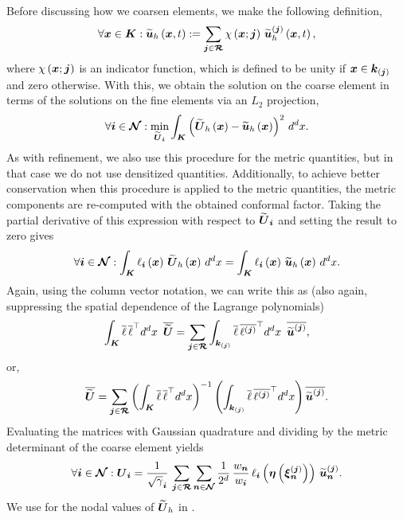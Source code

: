 Before discussing how we coarsen elements, we make the following definition,
\begin{equation}
  \forall\boldsymbol{x}\in\boldsymbol{K}:
  \widetilde{\boldsymbol{u}}_{h}\left(\boldsymbol{x},t\right)
  :=\sum\limits_{\boldsymbol{j}\in\boldsymbol{\mathcal{R}}}\chi\left(\boldsymbol{x};\boldsymbol{j}\right)\,
  \widetilde{\boldsymbol{u}}^{\left(\boldsymbol{j}\right)}_{h}\left(\boldsymbol{x},t\right),
\end{equation}
where $\chi\left(\boldsymbol{x};\boldsymbol{j}\right)$ is an indicator function, which is
defined to be unity if $\boldsymbol{x}\in\boldsymbol{k}_{\left(\boldsymbol{j}\right)}$ and zero
otherwise.
With this, we obtain the solution on the coarse
element in terms of the solutions
on the fine elements via an $L_{2}$ projection,
\begin{equation}
  \forall\boldsymbol{i}\in\boldsymbol{\mathcal{N}}:
  \min\limits_{\widetilde{\boldsymbol{U}}_{\boldsymbol{i}}}
  \int_{\boldsymbol{K}}
  \left(\widetilde{\boldsymbol{U}}_{h}\left(\boldsymbol{x}\right)
  -\widetilde{\boldsymbol{u}}_{h}\left(\boldsymbol{x}\right)\right)^{2}\,
  d^{d}x.
\end{equation}
As with refinement, we also use this procedure for the metric quantities,
but in that case we do not use densitized quantities.
Additionally, to achieve better conservation when this procedure is applied
to the metric quantities,
the metric components are re-computed with the obtained conformal factor.
Taking the partial derivative of this expression with respect to
$\widetilde{\boldsymbol{U}}_{\boldsymbol{i}}$ and setting the result to zero gives
\begin{equation}
  \forall\boldsymbol{i}\in\boldsymbol{\mathcal{N}}:
  \int_{\boldsymbol{K}}\ell_{\boldsymbol{i}}\left(\boldsymbol{x}\right)\,
  \widetilde{\boldsymbol{U}}_{h}\left(\boldsymbol{x}\right)\,d^{d}x
  =\int_{\boldsymbol{K}}\ell_{\boldsymbol{i}}\left(\boldsymbol{x}\right)\,
  \widetilde{\boldsymbol{u}}_{h}\left(\boldsymbol{x}\right)\,d^{d}x.
  \label{eq.coarsen}
\end{equation}
Again, using the column vector notation, we can write this as
(also again, suppressing the spatial dependence of the Lagrange
polynomials)
\begin{equation}
  \int_{\boldsymbol{K}}\overline{\ell}\,
  \overline{\ell}^{\top} d^{d}x\hspace{0.5em}
  \overline{\widetilde{\boldsymbol{U}}}
  =\sum\limits_{\boldsymbol{j}\in\boldsymbol{\mathcal{R}}}
  \int_{\boldsymbol{k}_{\left(\boldsymbol{j}\right)}}\overline{\ell}\,
  \overline{\ell^{\left(\boldsymbol{j}\right)}}^{\top} d^{d}x\hspace{0.5em}
  \overline{\widetilde{\boldsymbol{u}}^{\left(\boldsymbol{j}\right)}},
\end{equation}
or,
\begin{equation}
  \overline{\widetilde{\boldsymbol{U}}}
  =\sum\limits_{\boldsymbol{j}\in\boldsymbol{\mathcal{R}}}
  \left(\int_{\boldsymbol{K}}\overline{\ell}\,
  \overline{\ell}^{\top} d^{d}x\right)^{-1}
  \left(\int_{\boldsymbol{k}_{\left(\boldsymbol{j}\right)}}\overline{\ell}\,
  \overline{\ell^{\left(\boldsymbol{j}\right)}}^{\top} d^{d}x\right)
  \overline{\widetilde{\boldsymbol{u}}^{\left(\boldsymbol{j}\right)}}.
\end{equation}
Evaluating the matrices with Gaussian quadrature
and dividing by the metric determinant of the coarse element yields
\begin{equation}
  \forall\boldsymbol{i}\in\boldsymbol{\mathcal{N}}:\boldsymbol{U}_{\boldsymbol{i}}
  =\frac{1}{\sqrt{\gamma}_{\boldsymbol{i}}}\,
  \sum\limits_{\boldsymbol{j}\in\boldsymbol{\mathcal{R}}}
  \sum\limits_{\boldsymbol{n}\in\boldsymbol{\mathcal{N}}}
  \frac{1}{2^{d}}\,\frac{w_{\boldsymbol{n}}}{w_{\boldsymbol{i}}}\,
  \ell_{\boldsymbol{i}}\left(\boldsymbol{\eta}\left(\boldsymbol{\xi}_{\boldsymbol{n}}^{\left(\boldsymbol{j}\right)}\right)\right)\,
  \widetilde{\boldsymbol{u}}_{\boldsymbol{n}}^{\left(\boldsymbol{j}\right)}.
  \label{eq.crseNodal}
\end{equation}
We use  for the nodal values of $\widetilde{\boldsymbol{U}}_{h}$
in .


